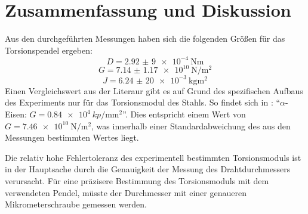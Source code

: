 \section{Zusammenfassung und Diskussion}
Aus den durchgeführten Messungen haben sich die folgenden Größen für das Torsionspendel ergeben:
\begin{equation*}
    D = \qty{2,92(9)e-4}{\newton\meter}
\end{equation*}
\begin{equation*}
    G = \qty{7.14(117)e10}{\newton\per\square\meter}
\end{equation*}
\begin{equation*}
    J = \qty{6,24(20)e-3}{\kilo\gram\meter\squared}
\end{equation*}
Einen Vergleichswert aus der Literaur gibt es auf Grund des spezifischen Aufbaus des Experiments nur für das Torsionsmodul des Stahls. So findet sich in \cite{Walcher2004}: "`$\alpha$-Eisen: $G = \qty{0,84e4}{kp\per\milli\meter\squared}$"'. Dies entspricht einem Wert von $G = \qty{7.46e10}{\newton\per\square\meter}$, was innerhalb einer Standardabweichung des aus den Messungen bestimmten Wertes liegt.

Die relativ hohe Fehlertoleranz des experimentell bestimmten Torsionsmoduls ist in der Hauptsache durch die Genauigkeit der Messung des Drahtdurchmessers verursacht.
Für eine präzisere Bestimmung des Torsionsmoduls mit dem verwendeten Pendel, müsste der Durchmesser mit einer genaueren Mikrometerschraube gemessen werden.
